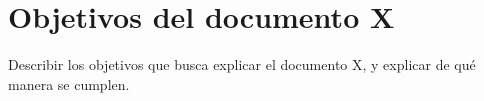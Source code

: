 \section{Objetivos del documento X}
Describir los objetivos que busca explicar el documento X, y explicar de qué manera se cumplen.
